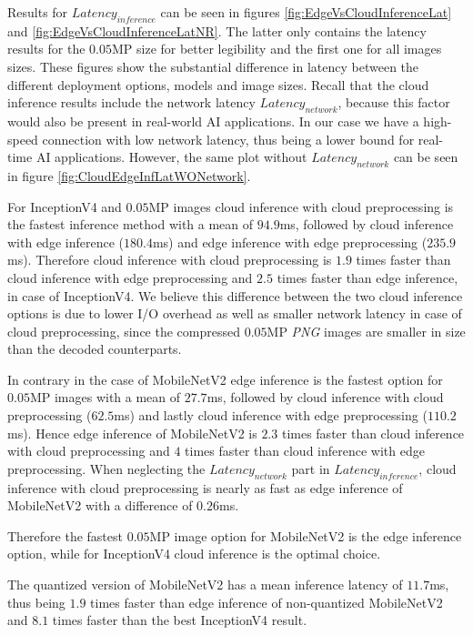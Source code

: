 Results for $Latency_{inference}$ can be seen in figures \ref{fig:EdgeVsCloudInferenceLat} and \ref{fig:EdgeVsCloudInferenceLatNR}. The latter only contains the latency results for the $0.05$MP size for better legibility and the first one for all images sizes.
These figures show the substantial difference in latency between the different deployment options, models and image sizes.
Recall that the cloud inference results include the network latency $Latency_{network}$, because this factor would also be present in real-world AI applications. 
In our case we have a high-speed connection with low network latency, thus being a lower bound for real-time AI applications. 
However, the same plot without $Latency_{network}$ can be seen in figure \ref{fig:CloudEdgeInfLatWONetwork}.

For InceptionV4 and $0.05$MP images cloud inference with cloud preprocessing is the fastest inference method with a mean of $94.9$ms, followed by cloud inference with edge inference ($180.4$ms) and edge inference with edge preprocessing ($235.9$ms).
Therefore cloud inference with cloud preprocessing is $1.9$ times faster than cloud inference with edge preprocessing and $2.5$ times faster than edge inference, in case of InceptionV4.
We believe this difference between the two cloud inference options is due to lower I/O overhead as well as smaller network latency in case of cloud preprocessing, since the compressed $0.05$MP \emph{PNG} images are smaller in size than the decoded counterparts. 

In contrary in the case of MobileNetV2 edge inference is the fastest option for $0.05$MP images with a mean of $27.7$ms, followed by cloud inference with cloud preprocessing ($62.5$ms) and lastly cloud inference with edge preprocessing ($110.2$ms).
Hence edge inference of MobileNetV2 is $2.3$ times faster than cloud inference with cloud preprocessing and $4$ times faster than cloud inference with edge preprocessing.
When neglecting the $Latency_{network}$ part in $Latency_{inference}$, cloud inference with cloud preprocessing is nearly as fast as edge inference of MobileNetV2 with a difference of $0.26$ms.

Therefore the fastest $0.05$MP image option for MobileNetV2 is the edge inference option, while for InceptionV4 cloud inference is the optimal choice.

The quantized version of MobileNetV2 has a mean inference latency of $11.7$ms, thus being $1.9$ times faster than edge inference of non-quantized MobileNetV2 and $8.1$ times faster than the best InceptionV4 result.

